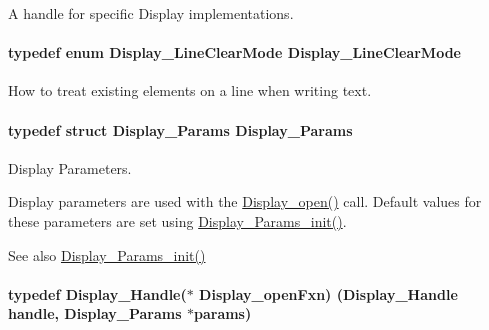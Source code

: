 A handle for specific Display implementations. 

\paragraph[{Display\+\_\+\+Line\+Clear\+Mode}]{\setlength{\rightskip}{0pt plus 5cm}typedef enum {\bf Display\+\_\+\+Line\+Clear\+Mode}  {\bf Display\+\_\+\+Line\+Clear\+Mode}}\label{_display_8h_af2fe59ceb3d8c9276018f1ef46e4251c}


How to treat existing elements on a line when writing text. 

\paragraph[{Display\+\_\+\+Params}]{\setlength{\rightskip}{0pt plus 5cm}typedef struct {\bf Display\+\_\+\+Params}  {\bf Display\+\_\+\+Params}}\label{_display_8h_a6b9502df6569d4ba369c01b50c7cdb9f}


Display Parameters. 

Display parameters are used with the \hyperlink{_display_8h_a3aa87973a354d4fd6a2969f764e8afe6}{Display\+\_\+open()} call. Default values for these parameters are set using \hyperlink{_display_8h_a4fb2982f52995a80194fbb107883a183}{Display\+\_\+\+Params\+\_\+init()}.

\begin{DoxySeeAlso}{See also}
\hyperlink{_display_8h_a4fb2982f52995a80194fbb107883a183}{Display\+\_\+\+Params\+\_\+init()} 
\end{DoxySeeAlso}
\paragraph[{Display\+\_\+open\+Fxn}]{\setlength{\rightskip}{0pt plus 5cm}typedef {\bf Display\+\_\+\+Handle}($\ast$ Display\+\_\+open\+Fxn) ({\bf Display\+\_\+\+Handle} handle, {\bf Display\+\_\+\+Params} $\ast$params)}\label{_display_8h_a3119ce57fb115a68a37d7ec274cb0001}


